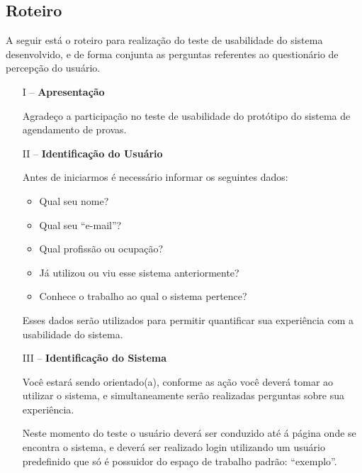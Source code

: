 \begin{apendicesenv}

\partapendices

\chapter{Roteiro}
\label{cap:roteiro}
A seguir está o roteiro para realização do teste de usabilidade do sistema desenvolvido, e de forma conjunta as perguntas referentes ao questionário de percepção do usuário.

\begin{enumerate}
    \item[I --] \textbf{Apresentação}

Agradeço a participação no teste de usabilidade do protótipo do sistema de agendamento de provas.

    \item[II --] \textbf{Identificação do Usuário}

Antes de iniciarmos é necessário informar os seguintes dados:

\begin{itemize}
    \item Qual seu nome?
    \item Qual seu “e-mail”?
    \item Qual profissão ou ocupação?
    \item Já utilizou ou viu esse sistema anteriormente?
    \item Conhece o trabalho ao qual o sistema pertence?
\end{itemize} 

Esses dados serão utilizados para permitir quantificar sua experiência com a usabilidade do sistema.

    \item[III --] \textbf{Identificação do Sistema}
   
Você estará sendo orientado(a), conforme as ação você deverá tomar ao utilizar o sistema, e simultaneamente serão realizadas perguntas sobre sua experiência. 
 
\begin{citacao}
    Neste momento do teste o usuário deverá ser conduzido até á página onde se encontra o sistema, e deverá ser realizado login utilizando um usuário predefinido que só é possuidor do espaço de trabalho padrão: “exemplo”.
\end{citacao}


\end{enumerate}
\end{apendicesenv}
